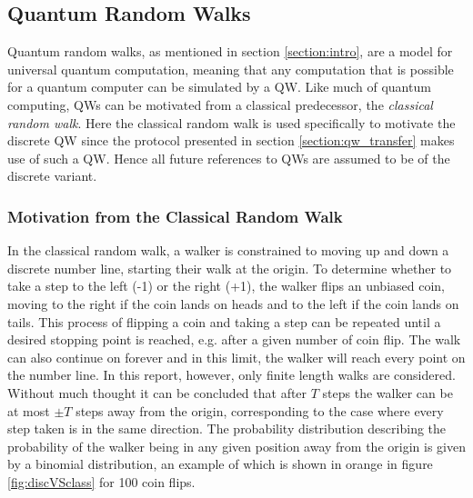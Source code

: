 \subsection{Quantum Random Walks}
Quantum random walks, as mentioned in section \ref{section:intro}, are a model for universal quantum computation, meaning that any computation that is possible for a quantum computer can be simulated by a QW.
Like much of quantum computing, QWs can be motivated from a classical predecessor, the \emph{classical random walk}.
Here the classical random walk is used specifically to motivate the discrete QW since the protocol presented in section \ref{section:qw_transfer} makes use of such a QW.
Hence all future references to QWs are assumed to be of the discrete variant.

\subsubsection{Motivation from the Classical Random Walk}
\label{subsubsection:classc_r_w}
In the classical random walk, a walker is constrained to moving up and down a discrete number line, starting their walk at the origin.
To determine whether to take a step to the left (-1) or the right (+1), the walker flips an unbiased coin, moving to the right if the coin lands on heads and to the left if the coin lands on tails. 
This process of flipping a coin and taking a step can be repeated until a desired stopping point is reached, e.g. after a given number of coin flip.
The walk can also continue on forever and in this limit, the walker will reach every point on the number line.
In this report, however, only finite length walks are considered.
Without much thought it can be concluded that after $T$ steps the walker can be at most $\pm T$ steps away from the origin, corresponding to the case where every step taken is in the same direction.
The probability distribution describing the probability of the walker being in any given position away from the origin is given by a binomial distribution, an example of which is shown in orange in figure \ref{fig:discVSclass} for 100 coin flips.

